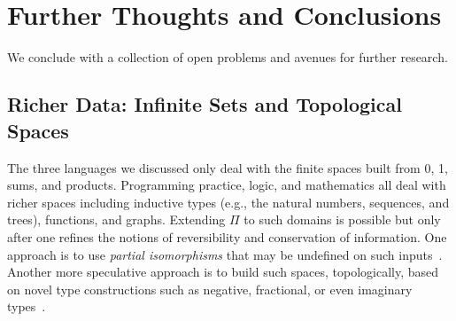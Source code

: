 \documentclass{article}
\begin{document}
\begin{code}
\AgdaSymbol{(}\AgdaSpace{}%
\AgdaSpace{}%
\AgdaSymbol{))}\<%
\\
%
\>[1]\AgdaSpace{}%
\AgdaSpace{}%
\AgdaSpace{}%
\AgdaSpace{}%
\<%
\\
\>[1][@{}l@{\AgdaIndent{0}}]%
\>[2]\AgdaSymbol{((}\AgdaSpace{}%
\AgdaSpace{}%
\AgdaSymbol{)}%
\>[22]\AgdaSpace{}%
\AgdaSymbol{(}\AgdaSpace{}%
\AgdaSpace{}%
\AgdaSymbol{))}\<%
\\
%
\>[1]\AgdaSpace{}%
\AgdaSpace{}%
\<%
\\
\>[1][@{}l@{\AgdaIndent{0}}]%
\>[2]\AgdaSymbol{((}\AgdaSpace{}%
\AgdaSpace{}%
\AgdaSpace{}%
\AgdaSpace{}%
\AgdaSymbol{(}\AgdaSpace{}%
\AgdaSpace{}%
\AgdaSymbol{))}\AgdaSpace{}%
\AgdaSymbol{)}\<%
\end{code}
 
\section{Further Thoughts and Conclusions}

We conclude with a collection of open problems and avenues for further research. 

\subsection{Richer Data: Infinite Sets and Topological Spaces} 

The three languages we discussed only deal with the finite spaces
built from 0, 1, sums, and products. Programming practice, logic, and
mathematics all deal with richer spaces including inductive types
(e.g., the natural numbers, sequences, and trees), functions, and
graphs. Extending $\Pi$ to such domains is possible but only after one
refines the notions of reversibility and conservation of
information. One approach is to use \emph{partial isomorphisms} that
may be undefined on such inputs~\cite{infeffects,rc2011}. Another more
speculative approach is to build such spaces, topologically, based on
novel type constructions such as negative, fractional, or even
imaginary types~\cite{seventrees,roshan-thesis}.
\end{document}
